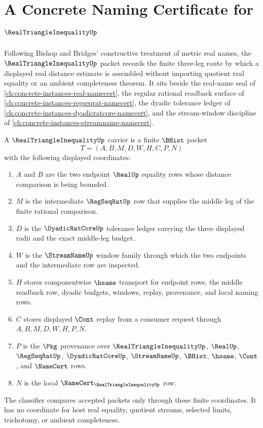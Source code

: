 \chapter{A Concrete Naming Certificate for $\RealTriangleInequalityUp$}
\label{ch:concrete-instances-real-triangle-inequality-namecert}

Following Bishop and Bridges' constructive treatment of metric real names, the $\RealTriangleInequalityUp$ packet records the finite three-leg route by which a displayed real distance estimate is assembled without importing quotient real equality or an ambient completeness theorem. It sits beside the real-name seal of \autoref{ch:concrete-instances-real-namecert}, the regular rational readback surface of \autoref{ch:concrete-instances-regseqrat-namecert}, the dyadic tolerance ledger of \autoref{ch:concrete-instances-dyadicratcore-namecert}, and the stream-window discipline of \autoref{ch:concrete-instances-streamname-namecert}.

\begin{definition}
\label{def:real-triangle-inequality-carrier}
A $\RealTriangleInequalityUp$ carrier is a finite $\BHist$ packet
$$
T=(A,B,M,D,W,H,C,P,N)
$$
with the following displayed coordinates:
\begin{enumerate}
\item $A$ and $B$ are the two endpoint $\RealUp$ equality rows whose distance comparison is being bounded.
\item $M$ is the intermediate $\RegSeqRatUp$ row that supplies the middle leg of the finite rational comparison.
\item $D$ is the $\DyadicRatCoreUp$ tolerance ledger carrying the three displayed radii and the exact middle-leg budget.
\item $W$ is the $\StreamNameUp$ window family through which the two endpoints and the intermediate row are inspected.
\item $H$ stores componentwise $\hsame$ transport for endpoint rows, the middle readback row, dyadic budgets, windows, replay, provenance, and local naming rows.
\item $C$ stores displayed $\Cont$ replay from a consumer request through $A,B,M,D,W,H,P,N$.
\item $P$ is the $\Pkg$ provenance over $\RealTriangleInequalityUp$, $\RealUp$, $\RegSeqRatUp$, $\DyadicRatCoreUp$, $\StreamNameUp$, $\BHist$, $\hsame$, $\Cont$, and $\NameCert$ rows.
\item $N$ is the local $\NameCert_{\RealTriangleInequalityUp}$ row.
\end{enumerate}
The classifier compares accepted packets only through these finite coordinates. It has no coordinate for host real equality, quotient streams, selected limits, trichotomy, or ambient completeness.
\end{definition}

